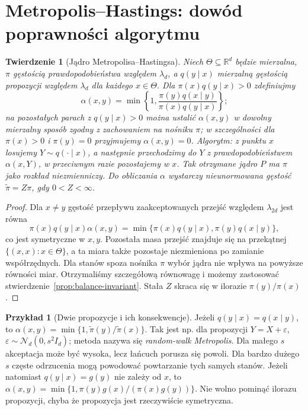 \documentclass[11pt,a4paper,oneside]{report}
\numberwithin{equation}{chapter}
\theoremstyle{plain}
\newtheorem{twierdzenie}{Twierdzenie}[chapter]
\theoremstyle{definition}
\newtheorem{przyklad}{Przykład}[chapter]
\theoremstyle{remark}
\newcommand{\R}{\mathbb R}
\newcommand{\Normal}{\mathcal N}
\begin{document}
\section{Metropolis--Hastings: dowód poprawności algorytmu}
\begin{twierdzenie}[Jądro Metropolisa--Hastingsa]
\label{thm:mh-detailed}
Niech $\Theta\subseteq\R^d$ będzie mierzalna,
$\pi$ gęstością prawdopodobieństwa względem $\lambda_d$,
a $q(y\mid x)$ mierzalną gęstością propozycji względem
$\lambda_d$ dla każdego $x\in\Theta$.
Dla $\pi(x)q(y\mid x)>0$ zdefiniujmy
\[
 \alpha(x,y)=\min\left\{1,
 \frac{\pi(y)q(x\mid y)}{\pi(x)q(y\mid x)}\right\};
\]
na pozostałych parach z $q(y\mid x)>0$ można ustalić
$\alpha(x,y)$ w dowolny mierzalny sposób zgodny z
zachowaniem na nośniku $\pi$; w szczególności dla
$\pi(x)>0$ i $\pi(y)=0$ przyjmujemy $\alpha(x,y)=0$.
Algorytm: z punktu $x$ losujemy $Y\sim q(\cdot\mid x)$,
a następnie przechodzimy do $Y$ z prawdopodobieństwem
$\alpha(x,Y)$, w przeciwnym razie pozostajemy w $x$.
Tak otrzymane jądro $P$ ma $\pi$ jako rozkład niezmienniczy.
Do obliczania $\alpha$ wystarczy nieunormowana
gęstość $\widetilde\pi=Z\pi$, gdy $0<Z<\infty$.
\end{twierdzenie}
\begin{proof}
Dla $x\ne y$ gęstość przepływu zaakceptowanych przejść
względem $\lambda_{2d}$ jest równa
\[
 \pi(x)q(y\mid x)\alpha(x,y)
 =\min\{\pi(x)q(y\mid x),\pi(y)q(x\mid y)\},
\]
co jest symetryczne w $x,y$. Pozostała masa przejść
znajduje się na przekątnej $\{(x,x):x\in\Theta\}$,
a ta miara także pozostaje niezmieniona po zamianie
współrzędnych. Dla stanów spoza nośnika $\pi$
wybór jądra nie wpływa na powyższe równości miar.
Otrzymaliśmy szczegółową równowagę i możemy zastosować
stwierdzenie~\ref{prop:balance-invariant}.
Stała $Z$ skraca się w ilorazie $\pi(y)/\pi(x)$.
\end{proof}

\begin{przyklad}[Dwie propozycje i ich konsekwencje]
Jeżeli $q(y\mid x)=q(x\mid y)$, to
$\alpha(x,y)=\min\{1,\widetilde\pi(y)/\widetilde\pi(x)\}$.
Tak jest np. dla propozycji $Y=X+\varepsilon$,
$\varepsilon\sim\Normal_d(0,s^2I_d)$; metoda nazywa się
\emph{random-walk Metropolis}. Dla małego $s$ akceptacja
może być wysoka, lecz łańcuch porusza się powoli. Dla
bardzo dużego $s$ częste odrzucenia mogą powodować
powtarzanie tych samych stanów.
Jeżeli natomiast $q(y\mid x)=g(y)$ nie zależy od $x$,
to $\alpha(x,y)=\min\{1,\pi(y)g(x)/(\pi(x)g(y))\}$.
Nie wolno pominąć ilorazu propozycji, chyba że
propozycja jest rzeczywiście symetryczna.
\end{przyklad}
\end{document}

